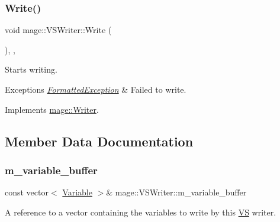 \subsubsection{\texorpdfstring{Write()}{Write()}}
{\footnotesize\ttfamily void mage\+::\+V\+S\+Writer\+::\+Write (\begin{DoxyParamCaption}{ }\end{DoxyParamCaption})\hspace{0.3cm}{\ttfamily [override]}, {\ttfamily [private]}, {\ttfamily [virtual]}}

Starts writing.


\begin{DoxyExceptions}{Exceptions}
{\em \hyperlink{structmage_1_1_formatted_exception}{Formatted\+Exception}} & Failed to write. \\
\hline
\end{DoxyExceptions}


Implements \hyperlink{classmage_1_1_writer_a9baf695ef7f6180bef883f60bcb3ac07}{mage\+::\+Writer}.



\subsection{Member Data Documentation}
\hypertarget{classmage_1_1_v_s_writer_a4f36e6a94d4fd8d3038f189a76582abe}{}\label{classmage_1_1_v_s_writer_a4f36e6a94d4fd8d3038f189a76582abe} 
\subsubsection{\texorpdfstring{m\+\_\+variable\+\_\+buffer}{m\_variable\_buffer}}
{\footnotesize\ttfamily const vector$<$ \hyperlink{structmage_1_1_variable}{Variable} $>$\& mage\+::\+V\+S\+Writer\+::m\+\_\+variable\+\_\+buffer\hspace{0.3cm}{\ttfamily [private]}}

A reference to a vector containing the variables to write by this \hyperlink{structmage_1_1_v_s}{VS} writer. 